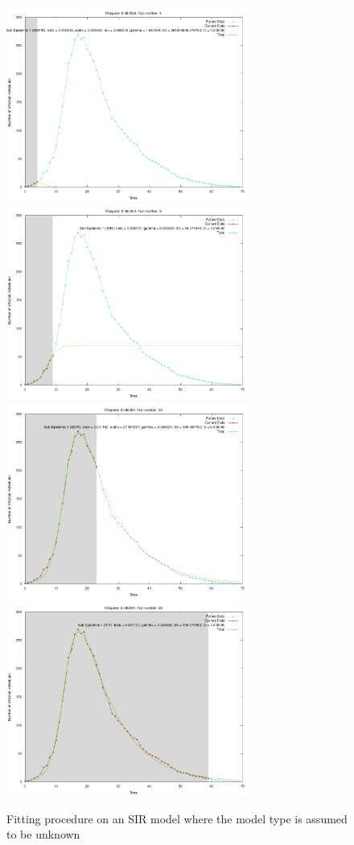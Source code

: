 \begin{centering}
\begin{figure}[h!]
  \includegraphics[width=8cm]{images/single/unknown.png}
  \includegraphics[width=8cm]{images/single/unknown1.png}
  \includegraphics[width=8cm]{images/single/unknown2.png}
  \includegraphics[width=8cm]{images/single/unknown3.png}
  \caption{Fitting procedure on an SIR model where the model type is
    assumed to be unknown}
\label{fig:unknown1}
  \end{figure}
\end{centering}

